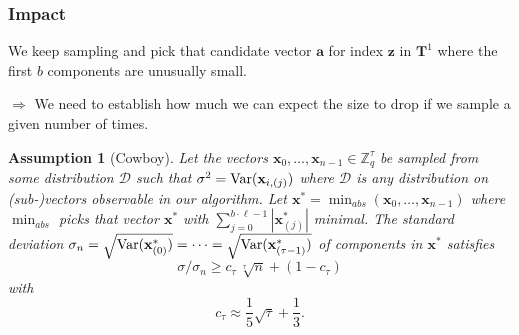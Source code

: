 \documentclass[10pt]{beamer}
\newcommand{\Var}{\ensuremath{\textnormal{Var}}}
\newcommand{\abs}[1]{\ensuremath{|#1|}\xspace}
\renewcommand{\vec}[1]{\mathbf{#1}\xspace}
\newcommand{\Z}{\ensuremath{\mathbb{Z}}\xspace}
\newtheorem{assumption}{Assumption}
\begin{document}
\begin{frame}[allowframebreaks]
\frametitle{Impact}

We keep sampling and pick that candidate vector $\vec{a}$ for index $\vec{z}$ in $\vec{T}^1$ where the first $b$ components are unusually small.

\vspace{1em}

$\Rightarrow$ We need to establish how much we can expect the size to drop if we sample a given number of times.

\framebreak

\begin{assumption}[Cowboy]
Let the vectors $\vec{x}_0,\ldots,\vec{x}_{n-1} \in \Z_q^{\tau}$ be sampled from some distribution $\mathcal{D}$ such that $\sigma^2 = \Var(\vec{x}_{i,(j)})$ where $\mathcal{D}$ is any distribution on (sub-)vectors observable in our algorithm. Let $\vec{x}^*=\min_{abs}\left(\vec{x}_0,\dots,\vec{x}_{n-1}\right)$ where $\min_{abs}$ picks that vector $\vec{x}^*$ with 
$\sum_{j=0}^{b\cdot\ell-1} \abs{\vec{x}^*_{(j)}}$ minimal. The standard deviation $\sigma_{n} = \sqrt{\Var(\vec{x}^*_{(0)})}=\cdots=\sqrt{\Var(\vec{x}^*_{(\tau-1)})}$ of components in $\vec{x}^*$ satisfies
$$\sigma/\sigma_n \geq c_\tau\, \sqrt[\tau]{n} + (1 - c_\tau)$$ with 
$$c_\tau \approx \frac{1}{5}\sqrt{\tau} + \frac{1}{3}.$$
\end{assumption}

\framebreak


\end{frame}
\end{document}
